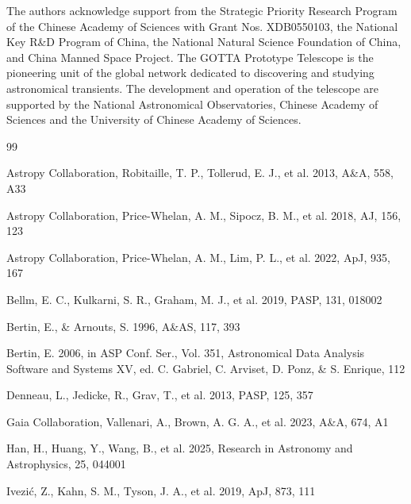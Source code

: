 \documentclass[referee]{raa}
\begin{document}
\begin{acknowledgements}
The authors acknowledge support from the Strategic Priority Research Program of the Chinese Academy of Sciences with Grant Nos. XDB0550103, the National Key R\&D Program of China, the National Natural Science Foundation of China, and China Manned Space Project. The GOTTA Prototype Telescope is the pioneering unit of the global network dedicated to discovering and studying astronomical transients. The development and operation of the telescope are supported by the National Astronomical Observatories, Chinese Academy of Sciences and the University of Chinese Academy of Sciences.
\end{acknowledgements}

\begin{thebibliography}{99}

Astropy Collaboration, Robitaille, T. P., Tollerud, E. J., et al. 2013, A\&A, 558, A33

Astropy Collaboration, Price-Whelan, A. M., Sipocz, B. M., et al. 2018, AJ, 156, 123

Astropy Collaboration, Price-Whelan, A. M., Lim, P. L., et al. 2022, ApJ, 935, 167

Bellm, E. C., Kulkarni, S. R., Graham, M. J., et al. 2019, PASP, 131, 018002

Bertin, E., \& Arnouts, S. 1996, A\&AS, 117, 393

Bertin, E. 2006, in ASP Conf. Ser., Vol. 351, Astronomical Data Analysis Software and Systems XV, ed. C. Gabriel, C. Arviset, D. Ponz, \& S. Enrique, 112

Denneau, L., Jedicke, R., Grav, T., et al. 2013, PASP, 125, 357

Gaia Collaboration, Vallenari, A., Brown, A. G. A., et al. 2023, A\&A, 674, A1

Han, H., Huang, Y., Wang, B., et al. 2025, Research in Astronomy and Astrophysics, 25, 044001

Ivezi\'c, Z., Kahn, S. M., Tyson, J. A., et al. 2019, ApJ, 873, 111


\end{thebibliography}
\end{document}
